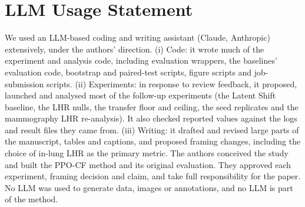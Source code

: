 \section*{LLM Usage Statement}
\label{sec:llm-statement}

We used an LLM-based coding and writing assistant (Claude, Anthropic) extensively, under the authors' direction. (i) Code: it wrote much of the experiment and analysis code, including evaluation wrappers, the baselines' evaluation code, bootstrap and paired-test scripts, figure scripts and job-submission scripts. (ii) Experiments: in response to review feedback, it proposed, launched and analysed most of the follow-up experiments (the Latent Shift baseline, the LHR nulls, the transfer floor and ceiling, the seed replicates and the mammography LHR re-analysis). It also checked reported values against the logs and result files they came from. (iii) Writing: it drafted and revised large parts of the manuscript, tables and captions, and proposed framing changes, including the choice of in-lung LHR as the primary metric. The authors conceived the study and built the PPO-CF method and its original evaluation. They approved each experiment, framing decision and claim, and take full responsibility for the paper. No LLM was used to generate data, images or annotations, and no LLM is part of the method.
